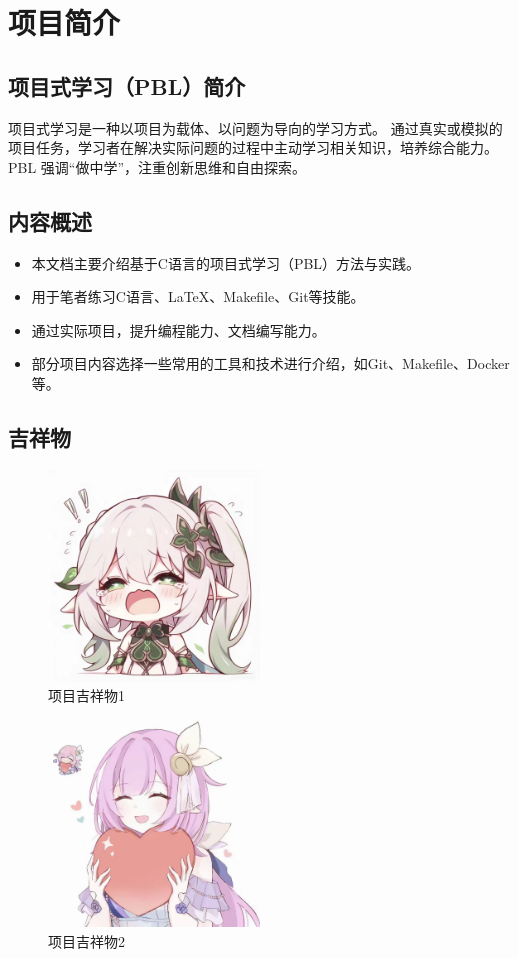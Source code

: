 \chapter{项目简介}

\section{项目式学习（PBL）简介}

项目式学习是一种以项目为载体、以问题为导向的学习方式。
通过真实或模拟的项目任务，学习者在解决实际问题的过程中主动学习相关知识，培养综合能力。
PBL 强调“做中学”，注重创新思维和自由探索。

\section{内容概述}

\begin{itemize}
    \item 本文档主要介绍基于C语言的项目式学习（PBL）方法与实践。
    \item 用于笔者练习C语言、\LaTeX、Makefile、Git等技能。
    \item 通过实际项目，提升编程能力、文档编写能力。
    \item 部分项目内容选择一些常用的工具和技术进行介绍，如Git、Makefile、Docker等。
\end{itemize}

\section{吉祥物}

\begin{figure}[htbp]
    \centering
    \includegraphics[width=0.5\textwidth]{images/1_4_xcs.jpg}
    \caption{项目吉祥物1}
    \label{fig:mascot}
\end{figure}

\begin{figure}
    \centering
    \includegraphics[width=0.5\textwidth]{images/1_4_xibr.jpg}
    \caption{项目吉祥物2}
    \label{fig:mascot2}
\end{figure}